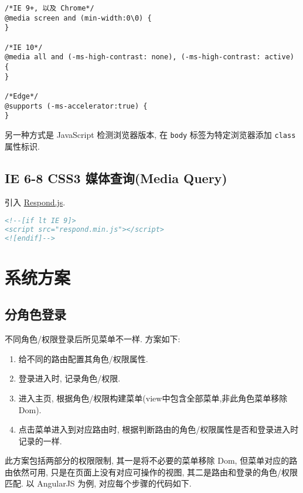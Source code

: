 \begin{lstlisting}
/*IE 9+, 以及 Chrome*/
@media screen and (min-width:0\0) {
}

/*IE 10*/
@media all and (-ms-high-contrast: none), (-ms-high-contrast: active) {
}

/*Edge*/
@supports (-ms-accelerator:true) {
}
\end{lstlisting}

另一种方式是 JavaScript 检测浏览器版本, 在 \lstinline!body!
标签为特定浏览器添加 \lstinline!class! 属性标识.

\subsection{IE 6-8 CSS3 媒体查询(Media
Query)}\label{ie-6-8-css3-ux5a92ux4f53ux67e5ux8be2media-query}

引入 \href{https://github.com/scottjehl/Respond}{Respond.js}.

\begin{lstlisting}[language=HTML]
<!--[if lt IE 9]>
<script src="respond.min.js"></script>
<![endif]-->
\end{lstlisting}

\section{系统方案}\label{ux7cfbux7edfux65b9ux6848}

\subsection{分角色登录}\label{ux5206ux89d2ux8272ux767bux5f55}

不同角色/权限登录后所见菜单不一样. 方案如下:

\begin{enumerate}
\def\labelenumi{\arabic{enumi}.}
\tightlist
\item
  给不同的路由配置其角色/权限属性.
\item
  登录进入时, 记录角色/权限.
\item
  进入主页, 根据角色/权限构建菜单(view中包含全部菜单,非此角色菜单移除
  Dom).
\item
  点击菜单进入到对应路由时,
  根据判断路由的角色/权限属性是否和登录进入时记录的一样.
\end{enumerate}

此方案包括两部分的权限限制, 其一是将不必要的菜单移除 Dom,
但菜单对应的路由依然可用, 只是在页面上没有对应可操作的视图,
其二是路由和登录的角色/权限匹配. 以 AngularJS 为例,
对应每个步骤的代码如下.

